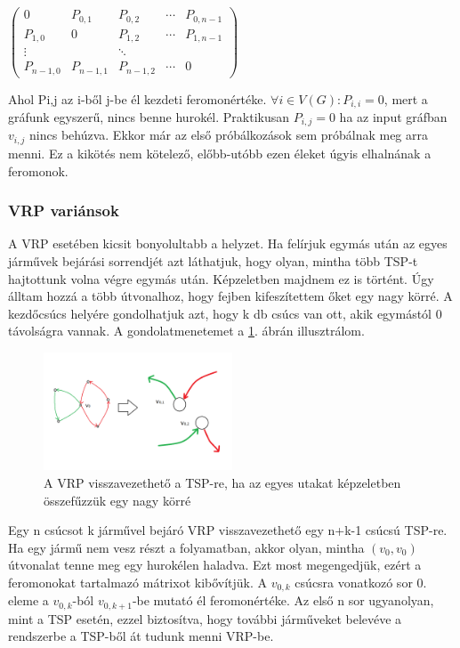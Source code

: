 $\begin{pmatrix}
	0 & P_{0,1} & P_{0,2} & \cdots & P_{0,n-1}\\ 
	P_{1,0} & 0 & P_{1,2} & \cdots & P_{1,n-1} \\
	\vdots & & \ddots \\
	P_{n-1,0} & P_{n-1,1} & P_{n-1,2} & \cdots & 0
\end{pmatrix}$

Ahol P{\scriptsize i,j} az i-ből j-be él kezdeti feromonértéke. \( \forall i\in V(G) : P_{i,i}=0 \), mert a gráfunk egyszerű, nincs benne hurokél. Praktikusan \( P_{i,j}=0 \) ha az input gráfban \(v_{i,j}\) nincs behúzva. Ekkor már az első próbálkozások sem próbálnak meg arra menni. Ez a kikötés nem kötelező, előbb-utóbb ezen éleket úgyis elhalnának a feromonok. 

\subsubsection{VRP variánsok} \label{VRPvariants_subsection}
A VRP esetében kicsit bonyolultabb a helyzet. Ha felírjuk egymás után az egyes járművek bejárási sorrendjét azt láthatjuk, hogy olyan, mintha több TSP-t hajtottunk volna végre egymás után. Képzeletben majdnem ez is történt. Úgy álltam hozzá a több útvonalhoz, hogy fejben kifeszítettem őket egy nagy körré. A kezdőcsúcs helyére gondolhatjuk azt, hogy k db csúcs van ott, akik egymástól 0 távolságra vannak. A gondolatmenetemet a \ref{tsp-to-vrp}. ábrán illusztrálom. 

\begin{figure}[ht!]
	\centering
	\includegraphics[width=0.5\textwidth]{figures/tsp-to-vrp.png}
	\caption{A VRP visszavezethető a TSP-re, ha az egyes utakat képzeletben összefűzzük egy nagy körré \label{tsp-to-vrp} }
\end{figure}

Egy n csúcsot k járművel bejáró VRP visszavezethető egy n+k-1 csúcsú TSP-re. Ha egy jármű nem vesz részt a folyamatban, akkor olyan, mintha \( (v_0,v_0) \) útvonalat tenne meg egy hurokélen haladva. Ezt most megengedjük, ezért a feromonokat tartalmazó mátrixot kibővítjük. A \(v_{0,k} \) csúcsra vonatkozó sor 0. eleme a \( v_{0,k}\)-ból \(v_{0,k+1}\)-be mutató él feromonértéke. Az első n sor ugyanolyan, mint a TSP esetén, ezzel biztosítva, hogy további járműveket belevéve a rendszerbe a TSP-ből át tudunk menni VRP-be.

